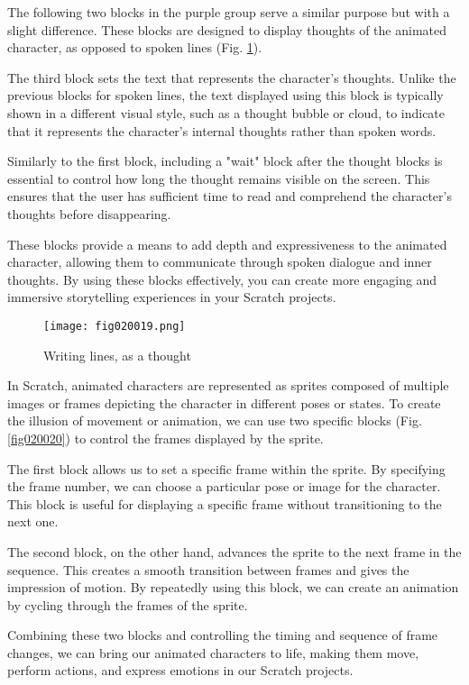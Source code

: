 The following two blocks in the purple group serve a similar purpose but with a slight difference. These blocks are designed to display thoughts of the animated character, as opposed to spoken lines (Fig. \ref{fig020019}).

The third block sets the text that represents the character's thoughts. Unlike the previous blocks for spoken lines, the text displayed using this block is typically shown in a different visual style, such as a thought bubble or cloud, to indicate that it represents the character's internal thoughts rather than spoken words.

Similarly to the first block, including a "wait" block after the thought blocks is essential to control how long the thought remains visible on the screen. This ensures that the user has sufficient time to read and comprehend the character's thoughts before disappearing.

These blocks provide a means to add depth and expressiveness to the animated character, allowing them to communicate through spoken dialogue and inner thoughts. By using these blocks effectively, you can create more engaging and immersive storytelling experiences in your Scratch projects.

\begin{figure}[H]
   \centering
   \texttt{[image: fig020019.png]}
   \caption{Writing lines, as a thought}
\label{fig020019}
\end{figure}

In Scratch, animated characters are represented as sprites composed of multiple images or frames depicting the character in different poses or states. To create the illusion of movement or animation, we can use two specific blocks (Fig. \ref{fig020020}) to control the frames displayed by the sprite.

The first block allows us to set a specific frame within the sprite. By specifying the frame number, we can choose a particular pose or image for the character. This block is useful for displaying a specific frame without transitioning to the next one.

The second block, on the other hand, advances the sprite to the next frame in the sequence. This creates a smooth transition between frames and gives the impression of motion. By repeatedly using this block, we can create an animation by cycling through the frames of the sprite.

Combining these two blocks and controlling the timing and sequence of frame changes, we can bring our animated characters to life, making them move, perform actions, and express emotions in our Scratch projects.

